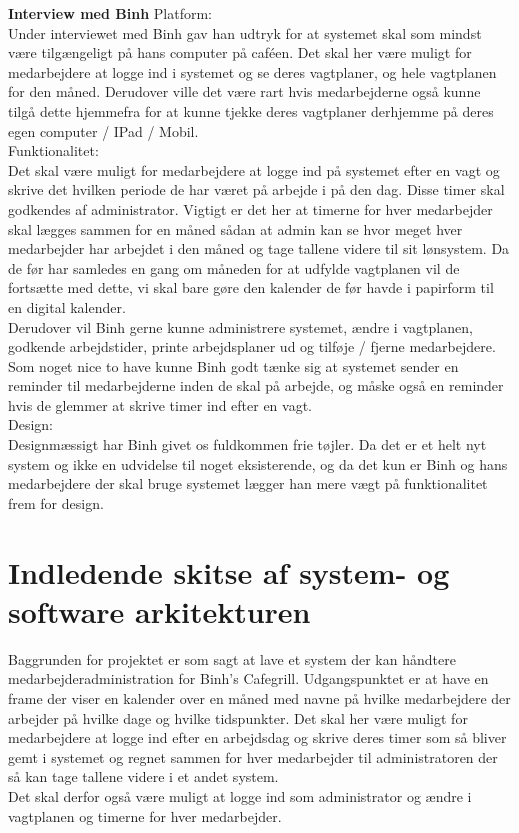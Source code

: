 \documentclass{article}
\begin{document}
\textbf{Interview med Binh}
Platform: \\
Under interviewet med Binh gav han udtryk for at systemet skal som mindst være tilgængeligt på hans computer på caféen. Det skal her være muligt for medarbejdere at logge ind i systemet og se deres vagtplaner, og hele vagtplanen for den måned. Derudover ville det være rart hvis medarbejderne også kunne tilgå dette hjemmefra for at kunne tjekke deres vagtplaner derhjemme på deres egen computer / IPad / Mobil. \\
Funktionalitet: \\
Det skal være muligt for medarbejdere at logge ind på systemet efter en vagt og skrive det hvilken periode de har været på arbejde i på den dag. Disse timer skal godkendes af administrator. Vigtigt er det her at timerne for hver medarbejder skal lægges sammen for en måned sådan at admin kan se hvor meget hver medarbejder har arbejdet i den måned og tage tallene videre til sit lønsystem. Da de før har samledes en gang om måneden for at udfylde vagtplanen vil de fortsætte med dette, vi skal bare gøre den kalender de før havde i papirform til en digital kalender. \\

Derudover vil Binh gerne kunne administrere systemet, ændre i vagtplanen, godkende arbejdstider, printe arbejdsplaner ud og tilføje / fjerne medarbejdere. \\
Som noget nice to have kunne Binh godt tænke sig at systemet sender en reminder til medarbejderne inden de skal på arbejde, og måske også en reminder hvis de glemmer at skrive timer ind efter en vagt. \\
Design: \\
Designmæssigt har Binh givet os fuldkommen frie tøjler. Da det er et helt nyt system og ikke en udvidelse til noget eksisterende, og da det kun er Binh og hans medarbejdere der skal bruge systemet lægger han mere vægt på funktionalitet frem for design. \\

\section{Indledende skitse af system- og software arkitekturen}
Baggrunden for projektet er som sagt at lave et system der kan håndtere medarbejderadministration for Binh’s Cafegrill. Udgangspunktet er at have en frame der viser en kalender over en måned med navne på hvilke medarbejdere der arbejder på hvilke dage og hvilke tidspunkter. Det skal her være muligt for medarbejdere at logge ind efter en arbejdsdag og skrive deres timer som så bliver gemt i systemet og regnet sammen for hver medarbejder til administratoren der så kan tage tallene videre i et andet system. \\
Det skal derfor også være muligt at logge ind som administrator og ændre i vagtplanen og timerne for hver medarbejder.	 \\
\end{document}
